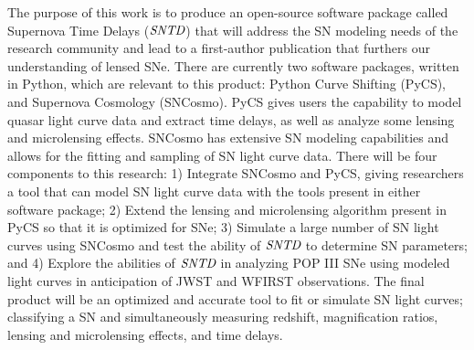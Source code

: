 The purpose of this work is to produce an open-source software package called Supernova Time Delays ($\textit{SNTD}$) that will address the SN modeling needs of the research community and lead to a first-author publication that furthers our understanding of lensed SNe. There are currently two software packages, written in Python, which are relevant to this product: Python Curve Shifting (PyCS), and Supernova Cosmology (SNCosmo). PyCS gives users the capability to model quasar light curve data and extract time delays, as well as analyze some lensing and microlensing effects. SNCosmo has extensive SN modeling capabilities and allows for the fitting and sampling of SN light curve data. There will be four components to this research: 1) Integrate SNCosmo and PyCS, giving researchers a tool that can model SN light curve data with the tools present in either software package; 2) Extend the lensing and microlensing algorithm present in PyCS so that it is optimized for SNe; 3) Simulate a large number of SN light curves using SNCosmo and test the ability of $\textit{SNTD}$ to determine SN parameters; and 4) Explore the abilities of $\textit{SNTD}$ in analyzing POP III SNe using modeled light curves in anticipation of JWST and WFIRST observations. The final product will be an optimized and accurate tool to fit or simulate SN light curves; classifying a SN and simultaneously measuring redshift, magnification ratios, lensing and microlensing effects, and time delays.


